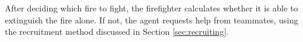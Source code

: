 

After deciding which fire to fight, the firefighter calculates whether it is able to extinguish the fire alone. If not, the agent requests help from teammates, using the recruitment method discussed in Section \ref{sec:recruiting}.

